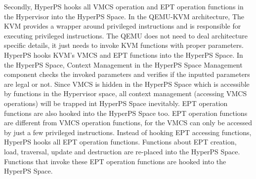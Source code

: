 Secondly,  HyperPS hooks all VMCS operation and EPT operation functions in the Hypervisor into the HyperPS Space.
In the QEMU-KVM architecture, The KVM provides a wrapper around privileged instructions and is responsible for executing privileged instructions.
The QEMU does not need to deal architecture specific details, it just needs to invoke KVM functions with proper parameters. 
HyperPS hooks KVM's VMCS and EPT functions into the HyperPS Space. In the HyperPS Space, Context Management in the HyperPS Space Management component checks the invoked parameters and verifies if the inputted parameters are legal or not.  
Since VMCS is hidden in the HyperPS Space which is accessible by functions in the Hypervisor space, all context management (accessing VMCS operations) will be trapped int HyperPS Space inevitably.
EPT operation functions are also hooked into the HyperPS Space too. EPT operation functions are different from VMCS operation functions, for the VMCS can only be accessed by just a few privileged instructions. Instead of hooking EPT accessing functions, HyperPS hooks all EPT operation functions. Functions about EPT creation, load, traversal, update and destruction are re-placed into the HyperPS Space. Functions that invoke these EPT operation functions are hooked into the HyperPS Space.


